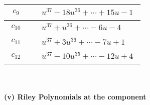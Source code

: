 \documentclass[1p]{elsarticle_modified}
\theoremstyle{definition}
\begin{document}
\begin{tabular}{m{50pt}|m{274pt}}
\hline $$\begin{aligned}c_{9}\end{aligned}$$&$\begin{aligned}
&u^{37}-18 u^{36}+\cdots+15 u-1
\end{aligned}$\\
\hline $$\begin{aligned}c_{10}\end{aligned}$$&$\begin{aligned}
&u^{37}+u^{36}+\cdots-6 u-4
\end{aligned}$\\
\hline $$\begin{aligned}c_{11}\end{aligned}$$&$\begin{aligned}
&u^{37}+3 u^{36}+\cdots-7 u+1
\end{aligned}$\\
\hline $$\begin{aligned}c_{12}\end{aligned}$$&$\begin{aligned}
&u^{37}-10 u^{35}+\cdots-12 u+4
\end{aligned}$\\
\hline
\end{tabular}\\~\\
\newpage\renewcommand{\arraystretch}{1}
\flushleft \textbf{(v) Riley Polynomials at the component}\newline \\
\end{document}
